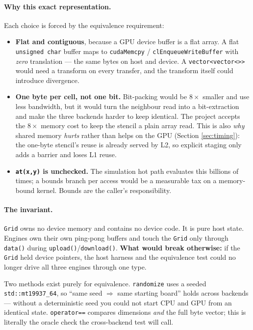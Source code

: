 \documentclass[
	english,
	letterpaper, oneside
]{article}
\begin{document}
\paragraph{Why this exact representation.} Each choice is forced by the
equivalence requirement:

\begin{itemize}
	\item \textbf{Flat and contiguous}, because a GPU device buffer is a flat
	      array. A flat \texttt{unsigned char} buffer maps to \texttt{cudaMemcpy}
	      / \texttt{clEnqueueWriteBuffer} with \emph{zero} translation --- the
	      same bytes on host and device. A \texttt{vector<vector<>>} would need a
	      transform on every transfer, and the transform itself could introduce
	      divergence.
	\item \textbf{One byte per cell, not one bit.} Bit-packing would be
	      $8\times$ smaller and use less bandwidth, but it would turn the
	      neighbour read into a bit-extraction and make the three backends harder
	      to keep identical. The project accepts the $8\times$ memory cost to keep
	      the stencil a plain array read. This is also \emph{why} shared memory
	      \emph{hurts} rather than helps on the GPU (Section \ref{sec:timing}): the
	      one-byte stencil's reuse is already served by L2, so explicit staging only adds a
		barrier and loses L1 reuse.
	\item \textbf{\texttt{at(x,y)} is unchecked.} The simulation hot path
	      evaluates this billions of times; a bounds branch per access would be a
	      measurable tax on a memory-bound kernel. Bounds are the caller's
	      responsibility.
\end{itemize}

\paragraph{The invariant.} \texttt{Grid} owns no device memory and contains no
device code. It is pure host state. Engines own their own ping-pong buffers and
touch the \texttt{Grid} only through \texttt{data()} during
\texttt{upload()}/\texttt{download()}. \textbf{What would break otherwise:} if the
\texttt{Grid} held device pointers, the host harness and the equivalence test
could no longer drive all three engines through one type.

Two methods exist purely for equivalence. \texttt{randomize} uses a seeded
\texttt{std::mt19937\_64}, so ``same seed $\Rightarrow$ same starting board''
holds across backends --- without a deterministic seed you could not start CPU
and GPU from an identical state. \texttt{operator==} compares dimensions
\emph{and} the full byte vector; this is literally the oracle check the
cross-backend test will call.
\end{document}
